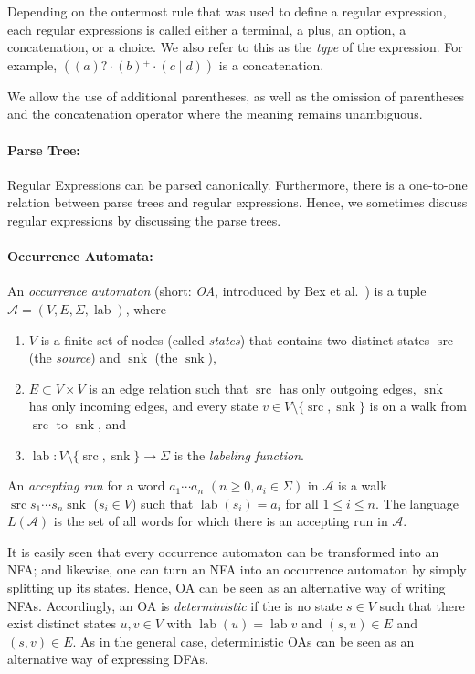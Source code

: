 \documentclass[a4paper,11pt, svgnames,titlepage]{article}
\newcommand{\rxp}{{^\mathtt{+}}}
\newcommand{\rxo}{\mathtt{?}}
\newcommand{\rxc}{\cdot}
\DeclareMathOperator{\ror}{\mathtt{|}}
\DeclareMathOperator{\lab}{lab}
\DeclareMathOperator{\src}{src}
\DeclareMathOperator{\snk}{snk}
\begin{document}
Depending on the outermost rule that was used to define a regular expression, each regular expressions is called either a terminal, a plus, an option, a concatenation, or a choice. We also refer to this as the \emph{type} of the expression. For example, $((a)\rxo \rxc (b)\rxp \rxc (c\ror d))$ is a concatenation.

We allow the use of additional parentheses, as well as the omission of parentheses and the concatenation operator where the meaning remains unambiguous.

\paragraph{Parse Tree:} Regular Expressions can be parsed canonically. Furthermore, there is a one-to-one relation between parse trees and regular expressions. Hence, we sometimes discuss regular expressions by discussing the parse trees.

\paragraph{Occurrence Automata:} An \emph{occurrence automaton} (short: \emph{OA}, introduced by Bex et al.~\cite{bex:kore}) is a tuple $\mathcal{A}=(V,E,\Sigma,\lab)$, where 
\begin{enumerate}
	\item $V$ is a finite set of nodes (called \emph{states}) that contains two distinct states $\src$ (the \emph{source}) and $\snk$ (the $\snk$),
	\item $E\subset V\times V$ is an edge relation such that $\src$ has only outgoing edges, $\snk$ has only incoming edges, and every state $v\in V\setminus\{\src,\snk\}$ is on a walk from $\src$ to $\snk$, and
	\item $\lab: V\setminus\{\src,\snk\} \to \Sigma $ is the \emph{labeling function}. 
\end{enumerate}
An \emph{accepting run} for a word $a_1 \cdots a_n$ $(n\geq 0, a_i\in\Sigma)$ in $\mathcal{A}$ is a walk $\src s_1 \cdots s_n \snk$ ($s_i\in V$) such that $\lab(s_i)=a_i$ for all $1\leq i \leq n$. The language $L(\mathcal{A})$ is the set of all words for which there is an accepting run in $\mathcal{A}$.

It is easily seen that every occurrence automaton can be transformed into an NFA; and likewise, one can turn an NFA into an occurrence automaton by simply splitting up its states. Hence, OA can be seen  as an alternative way of writing NFAs. Accordingly, an OA is \emph{deterministic} if the is no state $s\in V$ such that there exist distinct states $u,v\in V$ with $\lab(u)=\lab{v}$ and $(s,u)\in E$ and $(s,v)\in E$. As in the general case, deterministic OAs can be seen as an alternative way of expressing DFAs.
\end{document}
